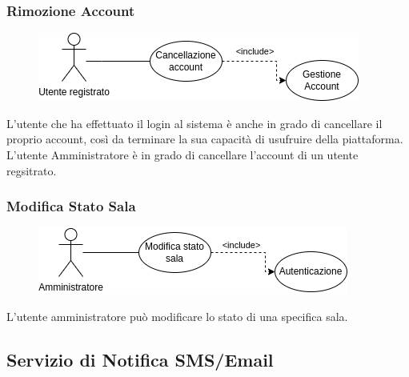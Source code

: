 \documentclass{article}
\begin{document}
\subsubsection{Rimozione Account}\label{rf_9}
\begin{description}

	\begin{figure}[htp]
	\centering
	\includegraphics[]{rf9.png}
	\end{figure}

    \item L'utente che ha effettuato il login al sistema è anche in grado di cancellare il proprio account, così da terminare la sua capacità di usufruire della piattaforma. L'utente Amministratore è in grado di cancellare l'account di un utente regsitrato.
\end{description}

\renewcommand\thesubsubsection{RF 10}
\subsubsection{Modifica Stato Sala}\label{rf_10}
\begin{description}

	\begin{figure}[htp]
	\centering
	\includegraphics[]{rf10.png}
	\end{figure}

    \item L’utente amministratore può modificare lo stato di una specifica sala.
\end{description}

\clearpage

\subsection{Servizio di Notifica SMS/Email}
\renewcommand\thesubsubsection{RF 11}
\end{document}
